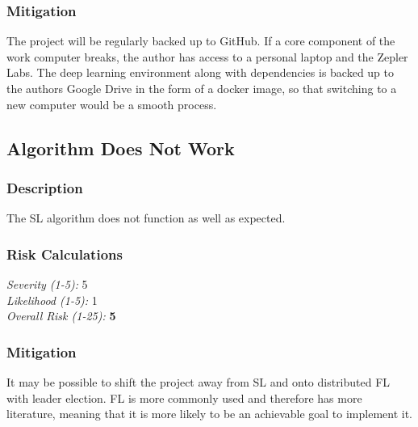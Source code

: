 \subsubsection{Mitigation}
The project will be regularly backed up to GitHub. If a core component of the work computer breaks, the author has access to a personal laptop and the Zepler Labs. The deep learning environment along with dependencies is backed up to the authors Google Drive in the form of a docker image, so that switching to a new computer would be a smooth process.

\subsection{Algorithm Does Not Work}
\subsubsection{Description}
The SL algorithm does not function as well as expected.

\subsubsection{Risk Calculations}
\emph{Severity (1-5):} 5 \\
\emph{Likelihood (1-5):} 1 \\
\emph{Overall Risk (1-25):} \textbf{5}

\subsubsection{Mitigation}
It may be possible to shift the project away from SL and onto distributed FL with leader election. FL is more commonly used and therefore has more literature, meaning that it is more likely to be an achievable goal to implement it.